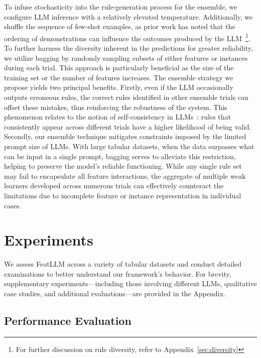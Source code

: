 To infuse stochasticity into the rule-generation process for the ensemble, we configure LLM inference with a relatively elevated temperature. Additionally, we shuffle the sequence of few-shot examples, as prior work has noted that the ordering of demonstrations can influence the outcomes produced by the LLM~\cite{lu2022fantastically}\footnote{For further discussion on rule diversity, refer to Appendix~\ref{sec:diversity}}. To further harness the diversity inherent in the predictions for greater reliability, we utilize bagging by randomly sampling subsets of either features or instances during each trial. This approach is particularly beneficial as the size of the training set or the number of features increases. The ensemble strategy we propose yields two principal benefits. Firstly, even if the LLM occasionally outputs erroneous rules, the correct rules identified in other ensemble trials can offset these mistakes, thus reinforcing the robustness of the system. This phenomenon relates to the notion of self-consistency in LLMs~\cite{wang2022self}: rules that consistently appear across different trials have a higher likelihood of being valid. Secondly, our ensemble technique mitigates constraints imposed by the limited prompt size of LLMs. With large tabular datasets, when the data surpasses what can be input in a single prompt, bagging serves to alleviate this restriction, helping to preserve the model’s reliable functioning. While any single rule set may fail to encapsulate all feature interactions, the aggregate of multiple weak learners developed across numerous trials can effectively counteract the limitations due to incomplete feature or instance representation in individual cases.

\section{Experiments}
We assess \textsf{FeatLLM} across a variety of tabular datasets and conduct detailed examinations to better understand our framework’s behavior. For brevity, supplementary experiments—including those involving different LLMs, qualitative case studies, and additional evaluations—are provided in the Appendix.

\subsection{Performance Evaluation}
